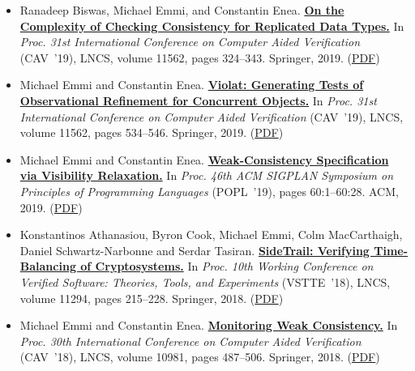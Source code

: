\documentclass{article}
\begin{document}
\begin{itemize}[leftmargin=0cm,label={}]
    \item Ranadeep Biswas, Michael Emmi, and Constantin Enea. {\bf\href{%
    https://doi.org/10.1007/978-3-030-25543-5_19}{%
    On the Complexity of Checking Consistency for Replicated Data Types.}} In \emph{ Proc. 31st International Conference on Computer Aided Verification } (CAV ’19), LNCS, volume 11562, pages 324–343. Springer, 2019. (\href{https://michael-emmi.github.io/https://github.com/michael-emmi/research-papers/raw/master/conf-cav-BiswasEE19.pdf}{PDF})


    \item Michael Emmi and Constantin Enea. {\bf\href{%
    https://doi.org/10.1007/978-3-030-25543-5_30}{%
    Violat: Generating Tests of Observational Refinement for Concurrent Objects.}} In \emph{ Proc. 31st International Conference on Computer Aided Verification } (CAV ’19), LNCS, volume 11562, pages 534–546. Springer, 2019. (\href{https://michael-emmi.github.io/https://github.com/michael-emmi/research-papers/raw/master/conf-cav-EmmiE19.pdf}{PDF})


    \item Michael Emmi and Constantin Enea. {\bf\href{%
    https://dl.acm.org/citation.cfm?id=3290373}{%
    Weak-Consistency Specification via Visibility Relaxation.}} In \emph{ Proc. 46th ACM SIGPLAN Symposium on Principles of Programming Languages } (POPL ’19), pages 60:1–60:28. ACM, 2019. (\href{https://michael-emmi.github.io/https://github.com/michael-emmi/research-papers/raw/master/conf-popl-EmmiE19.pdf}{PDF})


    \item Konstantinos Athanasiou, Byron Cook, Michael Emmi, Colm MacCarthaigh, Daniel Schwartz-Narbonne and Serdar Tasiran. {\bf\href{%
    https://doi.org/10.1007/978-3-030-03592-1_12}{%
    SideTrail: Verifying Time-Balancing of Cryptosystems.}} In \emph{ Proc. 10th Working Conference on Verified Software: Theories, Tools, and Experiments } (VSTTE ’18), LNCS, volume 11294, pages 215–228. Springer, 2018. (\href{https://michael-emmi.github.io/https://github.com/michael-emmi/research-papers/raw/master/conf-vstte-AthanasiouCEMST18.pdf}{PDF})


    \item Michael Emmi and Constantin Enea. {\bf\href{%
    https://doi.org/10.1007/978-3-319-96145-3_26}{%
    Monitoring Weak Consistency.}} In \emph{ Proc. 30th International Conference on Computer Aided Verification } (CAV ’18), LNCS, volume 10981, pages 487–506. Springer, 2018. (\href{https://michael-emmi.github.io/https://github.com/michael-emmi/research-papers/raw/master/conf-cav-EmmiE18.pdf}{PDF})



\end{itemize}
\end{document}
